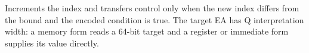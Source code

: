 Increments the index and transfers control only when the new index differs from the bound and the encoded condition is true. The target EA has Q interpretation width: a memory form reads a 64-bit target and a register or immediate form supplies its value directly.
